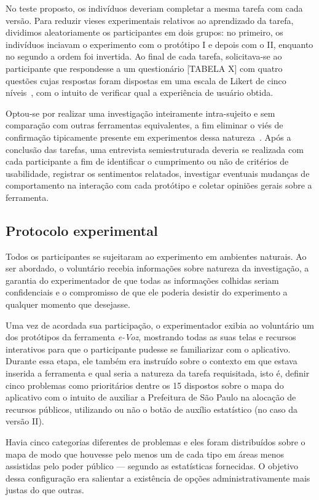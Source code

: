 \documentclass{sigchi}
\begin{document}
No teste proposto, os indivíduos deveriam completar a mesma tarefa com cada versão. Para reduzir vieses experimentais relativos ao aprendizado da tarefa, dividimos aleatoriamente os participantes em dois grupos: no primeiro, os indivíduos inciavam o experimento com o protótipo I e depois com o II, enquanto no segundo a ordem foi invertida. Ao final de cada tarefa, solicitava-se ao participante que respondesse a um questionário [TABELA X] com quatro questões cujas respostas foram dispostas em uma escala de Likert de cinco níveis~\cite{likert:1932}, com o intuito de verificar qual a experiência de usuário obtida.

Optou-se por realizar uma investigação inteiramente intra-sujeito e sem comparação com outras ferramentas equivalentes, a fim eliminar o viés de confirmação tipicamente presente em experimentos dessa natureza~\cite{dell:2012}. Após a conclusão das tarefas, uma entrevista semiestruturada deveria se realizada com cada participante a fim de identificar o cumprimento ou não de critérios de usabilidade, registrar os sentimentos relatados, investigar eventuais mudanças de comportamento na interação com cada protótipo e coletar opiniões gerais sobre a ferramenta.

\subsection{Protocolo experimental}
Todos os participantes se sujeitaram ao experimento em ambientes naturais. Ao ser abordado, o voluntário recebia informações sobre natureza da investigação, a garantia do experimentador de que todas as informações colhidas seriam confidenciais e o compromisso de que ele poderia desistir do experimento a qualquer momento que desejasse.

Uma vez de acordada sua participação, o experimentador exibia ao voluntário um dos protótipos da ferramenta \textit{e-Voz}, mostrando todas as suas telas e recursos interativos para que o participante pudesse se familiarizar com o aplicativo. Durante essa etapa, ele também era instruído sobre o contexto em que estava inserida a ferramenta e qual seria a natureza da tarefa requisitada, isto é, definir cinco problemas como prioritários dentre os 15 dispostos sobre o mapa do aplicativo com o intuito de auxiliar a Prefeitura de São Paulo na alocação de recursos públicos, utilizando ou não o botão de auxílio estatístico (no caso da versão II).

Havia cinco categorias diferentes de problemas e eles foram distribuídos sobre o mapa de modo que houvesse pelo menos um de cada tipo em áreas menos assistidas pelo poder público --- segundo as estatísticas fornecidas. O objetivo dessa configuração era salientar a existência de opções administrativamente mais justas do que outras.
\end{document}
